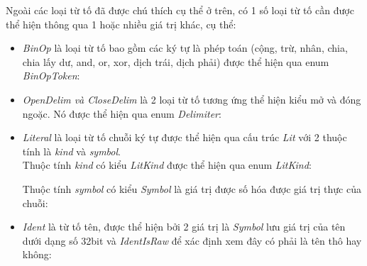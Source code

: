 Ngoài các loại từ tố đã được chú thích cụ thể ở trên, có 1 số loại từ tố cần được thể hiện thông qua 1 hoặc nhiều giá trị khác, cụ thể:
\begin{itemize}
  \item \textit{BinOp} là loại từ tố bao gồm các ký tự là phép toán (cộng, trừ, nhân, chia, chia lấy dư, and, or, xor, dịch trái, dịch phải) được thể hiện qua enum \textit{BinOpToken}:
  \item \textit{OpenDelim \emph{và} CloseDelim} là 2 loại từ tố tương ứng thể hiện kiểu mở và đóng ngoặc. Nó được thể hiện qua enum \textit{Delimiter}:
  \item \textit{Literal} là loại từ tố chuỗi ký tự được thể hiện qua cấu trúc \textit{Lit} với 2 thuộc tính là \textit{kind} và \textit{symbol}. 
  \\Thuộc tính \textit{kind} có kiểu \textit{LitKind} được thể hiện qua enum \textit{LitKind}: 
  
  Thuộc tính \textit{symbol} có kiểu \textit{Symbol} là giá trị được số hóa được giá trị thực của chuỗi:


  \item \textit{Ident} là từ tố tên, được thể hiện bởi 2 giá trị là \textit{Symbol} lưu giá trị của tên dưới dạng số 32bit và \textit{IdentIsRaw} để xác định xem đây có phải là tên thô hay không:
  

\end{itemize}
